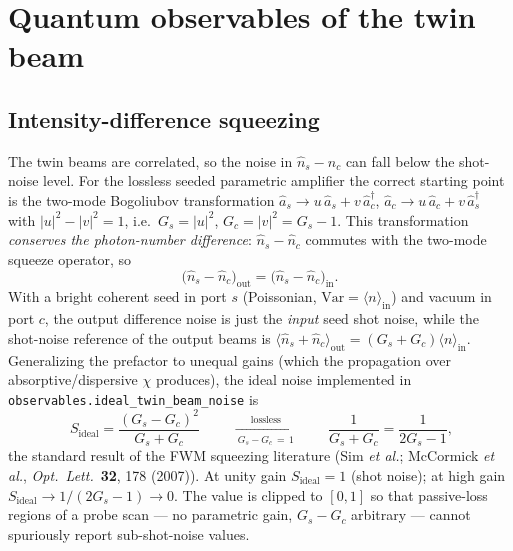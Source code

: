 \documentclass[11pt]{article}
\newcommand{\code}[1]{\texttt{#1}}
\begin{document}
\section{Quantum observables of the twin beam}

\subsection{Intensity-difference squeezing}
\label{sec:ids}

The twin beams are correlated, so the noise in $\hat n_s-\hat n_c$ can fall below
the shot-noise level. For the lossless seeded parametric amplifier the correct
starting point is the two-mode Bogoliubov transformation
$\hat a_s\to u\,\hat a_s+v\,\hat a_c^\dagger$,
$\hat a_c\to u\,\hat a_c+v\,\hat a_s^\dagger$ with $|u|^2-|v|^2=1$, i.e.\
$G_s=|u|^2$, $G_c=|v|^2=G_s-1$. This transformation \emph{conserves the
photon-number difference}: $\hat n_s-\hat n_c$ commutes with the two-mode squeeze
operator, so
\begin{equation}
\big(\hat n_s-\hat n_c\big)_{\text{out}}=\big(\hat n_s-\hat n_c\big)_{\text{in}}.
\label{eq:conserved}
\end{equation}
With a bright coherent seed in port $s$ (Poissonian,
$\mathrm{Var}=\langle n\rangle_{\text{in}}$) and vacuum in port $c$, the output
difference noise is just the \emph{input} seed shot noise, while the shot-noise
reference of the output beams is
$\langle\hat n_s+\hat n_c\rangle_{\text{out}}=(G_s+G_c)\langle n\rangle_{\text{in}}$.
Generalizing the prefactor to unequal gains (which the propagation over
absorptive/dispersive $\chi$ produces), the ideal noise implemented in
\code{observables.ideal\_twin\_beam\_noise} is
\begin{equation}
\boxed{\;
S_{\text{ideal}}=\frac{(G_s-G_c)^2}{G_s+G_c}
\;}
\qquad\xrightarrow[\ G_s-G_c\,=\,1\ ]{\text{lossless}}\qquad
\frac{1}{G_s+G_c}=\frac{1}{2G_s-1},
\label{eq:Sideal}
\end{equation}
the standard result of the FWM squeezing literature (Sim \emph{et al.};
McCormick \emph{et al.}, \emph{Opt.\ Lett.}\ \textbf{32}, 178 (2007)).
At unity gain $S_{\text{ideal}}=1$ (shot noise); at high gain
$S_{\text{ideal}}\to1/(2G_s-1)\to0$. The value is clipped to $[0,1]$ so that
passive-loss regions of a probe scan --- no parametric gain, $G_s-G_c$ arbitrary
--- cannot spuriously report sub-shot-noise values.
\end{document}
